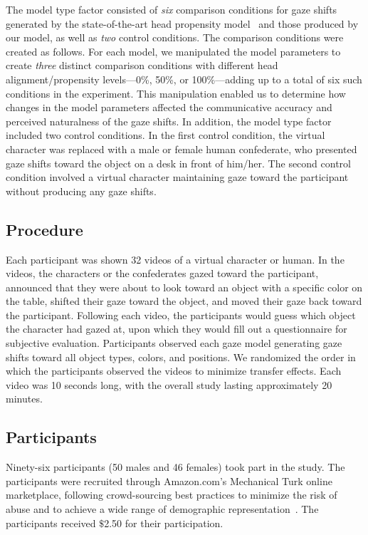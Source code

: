 The model type factor consisted of \emph{six} comparison conditions for gaze shifts generated by the state-of-the-art head propensity model~\citep{peters2010animating} and those produced by our model, as well as \emph{two} control conditions. The comparison conditions were created as follows. For each model, we manipulated the model parameters to create \emph{three} distinct comparison conditions with different head alignment/propensity levels---0\%, 50\%, or 100\%---adding up to a total of six such conditions in the experiment. This manipulation enabled us to determine how changes in the model parameters affected the communicative accuracy and perceived naturalness of the gaze shifts. In addition, the model type factor included two control conditions. In the first control condition, the virtual character was replaced with a male or female human confederate, who presented gaze shifts toward the object on a desk in front of him/her. The second control condition involved a virtual character maintaining gaze toward the participant without producing any gaze shifts.

\subsection{Procedure}

Each participant was shown 32 videos of a virtual character or human. In the videos, the characters or the confederates gazed toward the participant, announced that they were about to look toward an object with a specific color on the table, shifted their gaze toward the object, and moved their gaze back toward the participant. Following each video, the participants would guess which object the character had gazed at, upon which they would fill out a questionnaire for subjective evaluation. Participants observed each gaze model generating gaze shifts toward all object types, colors, and positions. We randomized the order in which the participants observed the videos to minimize transfer effects. Each video was 10 seconds long, with the overall study lasting approximately 20 minutes.

\subsection{Participants}

Ninety-six participants (50 males and 46 females) took part in the study. The participants were recruited through Amazon.com's Mechanical Turk online marketplace, following crowd-sourcing best practices to minimize the risk of abuse and to achieve a wide range of demographic representation~\citep{kittur2008crowdsourcing}. The participants received $\$$2.50 for their participation.


